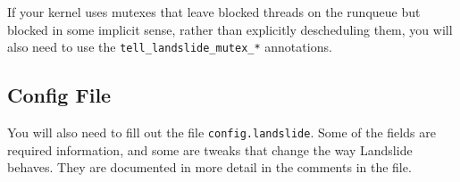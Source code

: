 \documentclass{article}
\begin{document}
If your kernel uses mutexes that leave blocked threads on the runqueue but blocked in some implicit sense, rather than explicitly descheduling them, you will also need to use the \texttt{tell\_landslide\_mutex\_*} annotations.


\subsection{Config File}
\label{sec:config}

You will also need to fill out the file \texttt{config.landslide}. Some of the fields are required information, and some are tweaks that change the way Landslide behaves. They are documented in more detail in the comments in the file.
\end{document}
